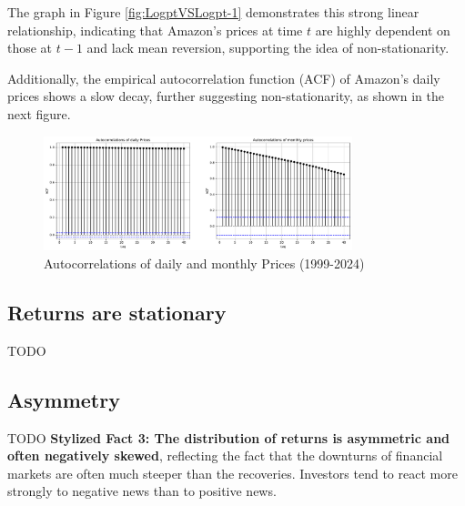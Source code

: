 \documentclass{article}
\begin{document}
\noindent The graph in Figure \ref{fig:LogptVSLogpt-1} demonstrates this strong linear 
relationship, indicating that Amazon's prices at time \( t \) are highly dependent on those at \( t-1 \) and lack mean reversion,
 supporting the idea of non-stationarity.

\noindent Additionally, the empirical autocorrelation function (ACF) of Amazon's daily prices shows a slow decay, further suggesting non-stationarity, as shown in the next figure.

\begin{figure}[H]
    \centering
    \includegraphics[width=0.8\textwidth]{Img/Autocorrel_daily_monthly.pdf}
    \caption{Autocorrelations of daily and monthly Prices (1999-2024)}
    \label{fig:Autocorrelations_daily_monthly}
\end{figure}

\subsection{Returns are stationary}
TODO
\subsection{Asymmetry}
TODO
\textbf{Stylized Fact 3: The distribution of returns is asymmetric and often negatively skewed}, reflecting the fact that the downturns of financial markets are often much steeper than the recoveries. Investors tend to react more strongly to negative news than to positive news.
\end{document}
